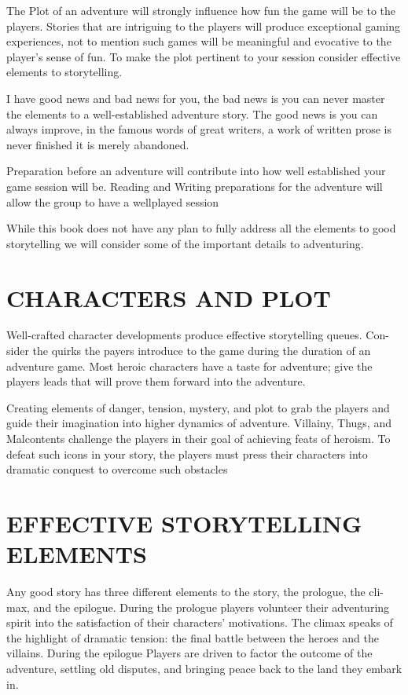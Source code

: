 \documentclass{article}
\begin{document}
	The Plot of an adventure will strongly influence how fun the game will be to the players. Stories
that are intriguing to the players will produce exceptional gaming experiences, not to mention
such games will be meaningful and evocative to the player’s sense of fun. To make the plot
pertinent to your session consider effective elements to storytelling.

	I have good news and bad news for you, the bad news is you can never master the elements to a
well-established adventure story. The good news is you can always improve, in the famous
words of great writers, a work of written prose is never finished it is merely abandoned.

	Preparation before an adventure will contribute into how well established your game session will
be. Reading and Writing preparations for the adventure will allow the group to have a wellplayed
session

	While this book does not have any plan to fully address all the elements to good storytelling we
will consider some of the important details to adventuring.

\section{CHARACTERS AND PLOT}

	Well-crafted character developments produce effective storytelling queues. Con- sider the quirks
the payers introduce to the game during the duration of an adventure game. Most heroic
characters have a taste for adventure; give the players leads that will prove them forward into the
adventure.

	Creating elements of danger, tension, mystery, and plot to grab the players and guide their
imagination into higher dynamics of adventure. Villainy, Thugs, and Malcontents challenge the
players in their goal of achieving feats of heroism. To defeat such icons in your story, the players
must press their characters into dramatic conquest to overcome such obstacles

\section{EFFECTIVE STORYTELLING ELEMENTS}

	Any good story has three different elements to the story, the prologue, the cli- max, and the
epilogue. During the prologue players volunteer their adventuring spirit into the satisfaction of
their characters’ motivations. The climax speaks of the highlight of dramatic tension: the final
battle between the heroes and the villains. During the epilogue Players are driven to factor the
outcome of the adventure, settling old disputes, and bringing peace back to the land they embark
in.
\end{document}
